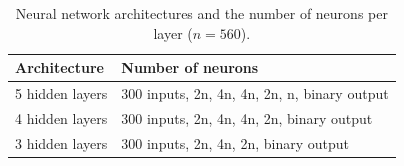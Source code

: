 \documentclass[10pt, letterpaper]{article}
\begin{document}
\begin{table}[!ht]
	\caption{Neural network architectures and the number of neurons per layer ($n=560$).}	\label{tab:params}
	\centering
	\begin{tabular}{l l}
		\toprule
		Architecture & Number of neurons \\
		\midrule
		 5 hidden layers & 300 inputs, 2n, 4n, 4n, 2n, n, binary output \\
		 4  hidden layers & 300 inputs, 2n, 4n, 4n, 2n, binary output \\
		 3 hidden layers & 300 inputs, 2n, 4n, 2n, binary output \\
		\bottomrule
	\end{tabular}
\end{table}
\end{document}

